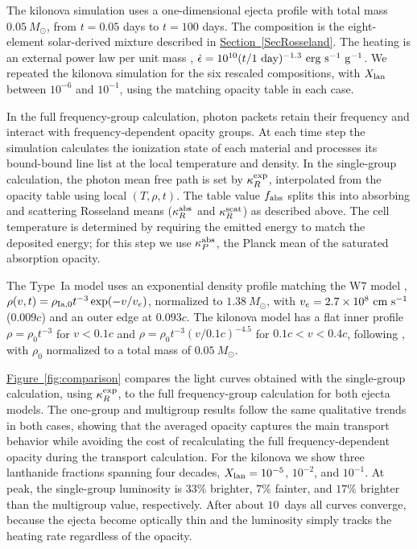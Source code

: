 \documentclass[final,5p,times,twocolumn]{elsarticle}
\DeclareRobustCommand{\secref}[1]{\hyperref[#1]{Section~\ref*{#1}}}
\DeclareRobustCommand{\figref}[1]{\hyperref[#1]{Figure~\ref*{#1}}}
\begin{document}
    The kilonova simulation uses a one-dimensional ejecta profile with total mass $0.05~M_\odot$,
    from $t=0.05$ days to $t=100$ days.
    The composition is the eight-element solar-derived mixture described in
    \secref{SecRosseland}. The heating is
    an external power law per unit mass \cite{korobkin2012kilonova},
    $\dot{\epsilon}=10^{10}(t/1~{\rm day})^{-1.3}~{\rm erg~s^{-1}~g^{-1}}$.
    We repeated the kilonova simulation for the six rescaled compositions, with $X_{\rm lan}$
    between $10^{-6}$ and $10^{-1}$, using the matching opacity table in each case.
    
    In the full frequency-group calculation, photon packets retain their frequency and interact with
    frequency-dependent opacity groups. At each time step the simulation calculates the ionization
    state of each material and processes its bound-bound line list at the local temperature and density.
    In the single-group calculation, the photon mean free path is set by $\kappa_R^{\rm exp}$,
    interpolated from the opacity table using local $(T,\rho,t)$.
    The table value $f_{\rm abs}$ splits this into absorbing and scattering Rosseland means
    ($\kappa_R^{\rm abs}$ and $\kappa_R^{\rm scat}$) as described above.
    The cell temperature is determined by requiring the emitted energy to match the
    deposited energy; for this step we use $\kappa_P^{\rm abs}$, the Planck mean of the saturated
    absorption opacity.

    The Type~Ia model uses an exponential density profile matching the W7 model \cite{nomoto1984w7},
    $\rho(v,t)=\rho_{\rm Ia,0}t^{-3}\exp(-v/v_e)$, normalized to $1.38~M_\odot$, with
    $v_e=2.7\times10^8~{\rm cm~s^{-1}}$ ($0.009c$) and an outer edge at $0.093c$.
    The kilonova model has a flat inner profile $\rho=\rho_0t^{-3}$ for $v<0.1c$ and
    $\rho=\rho_0t^{-3}(v/0.1c)^{-4.5}$ for $0.1c<v<0.4c$, following
    \cite{hotokezaka2020macronova}, with $\rho_0$ normalized to a total mass of $0.05~M_\odot$.

    \figref{fig:comparison} compares the light curves obtained with the single-group calculation,
    using $\kappa_R^{\rm exp}$, to the full frequency-group calculation for both ejecta
    models. The one-group and multigroup results follow the same qualitative trends in both cases,
    showing that the averaged opacity captures the main transport behavior while avoiding the cost of
    recalculating the full frequency-dependent opacity during the transport calculation.
    For the kilonova we show three lanthanide fractions spanning four decades,
    $X_{\rm lan}=10^{-5}$, $10^{-2}$, and $10^{-1}$. At peak, the single-group luminosity is
    $33\%$ brighter, $7\%$ fainter, and $17\%$ brighter than the multigroup value, respectively.
    After about $10$~days all curves converge, because the ejecta become optically thin and the
    luminosity simply tracks the heating rate regardless of the opacity.
\end{document}
